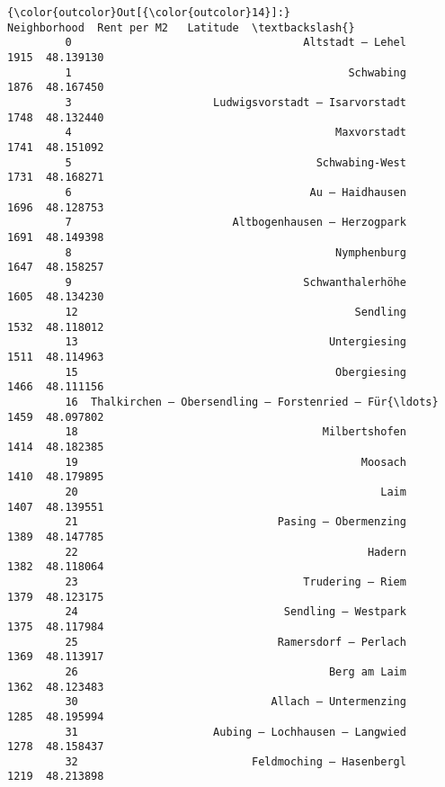\documentclass[11pt]{article}
\begin{document}
\begin{Verbatim}[commandchars=\\\{\}]
{\color{outcolor}Out[{\color{outcolor}14}]:}                                          Neighborhood  Rent per M2   Latitude  \textbackslash{}
         0                                    Altstadt – Lehel         1915  48.139130   
         1                                           Schwabing         1876  48.167450   
         3                      Ludwigsvorstadt – Isarvorstadt         1748  48.132440   
         4                                         Maxvorstadt         1741  48.151092   
         5                                      Schwabing-West         1731  48.168271   
         6                                     Au – Haidhausen         1696  48.128753   
         7                         Altbogenhausen – Herzogpark         1691  48.149398   
         8                                         Nymphenburg         1647  48.158257   
         9                                    Schwanthalerhöhe         1605  48.134230   
         12                                           Sendling         1532  48.118012   
         13                                       Untergiesing         1511  48.114963   
         15                                        Obergiesing         1466  48.111156   
         16  Thalkirchen – Obersendling – Forstenried – Für{\ldots}         1459  48.097802   
         18                                      Milbertshofen         1414  48.182385   
         19                                            Moosach         1410  48.179895   
         20                                               Laim         1407  48.139551   
         21                               Pasing – Obermenzing         1389  48.147785   
         22                                             Hadern         1382  48.118064   
         23                                   Trudering – Riem         1379  48.123175   
         24                                Sendling – Westpark         1375  48.117984   
         25                               Ramersdorf – Perlach         1369  48.113917   
         26                                       Berg am Laim         1362  48.123483   
         30                              Allach – Untermenzing         1285  48.195994   
         31                     Aubing – Lochhausen – Langwied         1278  48.158437   
         32                           Feldmoching – Hasenbergl         1219  48.213898   
         

\end{Verbatim}
\end{document}
